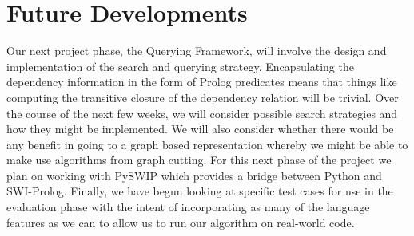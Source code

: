 \documentclass[11pt]{article}
\begin{document}
\section{Future Developments}

Our next project phase, the Querying Framework, will involve the design and
implementation of the search and querying strategy. Encapsulating the dependency
information in the form of Prolog predicates means that things like computing
the transitive closure of the dependency relation will be trivial. Over the
course of the next few weeks, we will consider possible search strategies and
how they might be implemented. We will also consider whether there would be any
benefit in going to a graph based representation whereby we might be able to
make use algorithms from graph cutting. For this next phase of the project we
plan on working with PySWIP \citep{pyswip} which provides a bridge between
Python and SWI-Prolog. Finally, we have begun looking at specific test cases for
use in the evaluation phase with the intent of incorporating as many of the language
features as we can to allow us to run our algorithm on real-world code.



\end{document}
